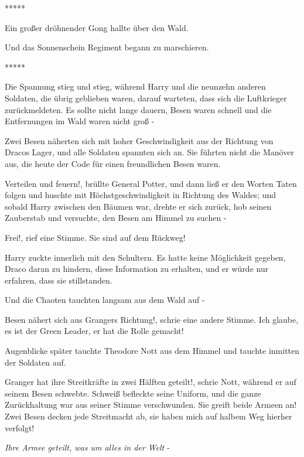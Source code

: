 \begin{center}*****\end{center}

Ein großer dröhnender Gong hallte über den Wald.

Und das Sonnenschein Regiment begann zu marschieren.

\begin{center}*****\end{center}

Die Spannung stieg und stieg, während Harry und die neunzehn anderen Soldaten,
die übrig geblieben waren, darauf warteten, dass sich die Luftkrieger
zurückmeldeten. Es sollte nicht lange dauern, Besen waren schnell und die
Entfernungen im Wald waren nicht groß -

Zwei Besen näherten sich mit hoher Geschwindigkeit aus der Richtung von Dracos
Lager, und alle Soldaten spannten sich an. Sie führten nicht die Manöver aus,
die heute der Code für einen freundlichen Besen waren.

\glqq{}Verteilen und feuern!\grqq{}, brüllte General Potter, und dann ließ er
den Worten Taten folgen und huschte mit Höchstgeschwindigkeit in Richtung des
Waldes; und sobald Harry zwischen den Bäumen war, drehte er sich zurück, hob
seinen Zauberstab und versuchte, den Besen am Himmel zu suchen -

\glqq{}Frei!\grqq{}, rief eine Stimme. \glqq{}Sie sind auf dem Rückweg!\grqq{}

Harry zuckte innerlich mit den Schultern. Es hatte keine Möglichkeit gegeben,
Draco daran zu hindern, diese Information zu erhalten, und er würde nur
erfahren, dass sie stillstanden.

Und die Chaoten tauchten langsam aus dem Wald auf -

\glqq{}Besen nähert sich aus Grangers Richtung!\grqq{}, schrie eine andere
Stimme. \glqq{}Ich glaube, es ist der Green Leader, er hat die Rolle
gemacht!\grqq{}

Augenblicke später tauchte Theodore Nott aus dem Himmel und tauchte inmitten der
Soldaten auf.

\glqq{}Granger hat ihre Streitkräfte in zwei Hälften geteilt!\grqq{}, schrie
Nott, während er auf seinem Besen schwebte. Schweiß befleckte seine Uniform, und
die ganze Zurückhaltung war aus seiner Stimme verschwunden. \glqq{}Sie greift
beide Armeen an! Zwei Besen decken jede Streitmacht ab, sie haben mich auf
halbem Weg hierher verfolgt!\grqq{}

\emph{Ihre Armee geteilt, was um alles in der Welt} -

